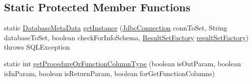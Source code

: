 \subsection*{Static Protected Member Functions}
\begin{DoxyCompactItemize}
\item 
static \mbox{\hyperlink{classcom_1_1mysql_1_1cj_1_1jdbc_1_1_database_meta_data}{Database\+Meta\+Data}} \mbox{\hyperlink{classcom_1_1mysql_1_1cj_1_1jdbc_1_1_database_meta_data_a599d79d54f0f2dcee19845af18403094}{get\+Instance}} (\mbox{\hyperlink{interfacecom_1_1mysql_1_1cj_1_1jdbc_1_1_jdbc_connection}{Jdbc\+Connection}} conn\+To\+Set, String database\+To\+Set, boolean check\+For\+Info\+Schema, \mbox{\hyperlink{classcom_1_1mysql_1_1cj_1_1jdbc_1_1result_1_1_result_set_factory}{Result\+Set\+Factory}} \mbox{\hyperlink{classcom_1_1mysql_1_1cj_1_1jdbc_1_1_database_meta_data_a339d870086c3e13ea14e9a6b3cf1894e}{result\+Set\+Factory}})  throws S\+Q\+L\+Exception 
\item 
static int \mbox{\hyperlink{classcom_1_1mysql_1_1cj_1_1jdbc_1_1_database_meta_data_a3e763c50539692ca2f6c0c987cec3fca}{get\+Procedure\+Or\+Function\+Column\+Type}} (boolean is\+Out\+Param, boolean is\+In\+Param, boolean is\+Return\+Param, boolean for\+Get\+Function\+Columns)
\end{DoxyCompactItemize}
